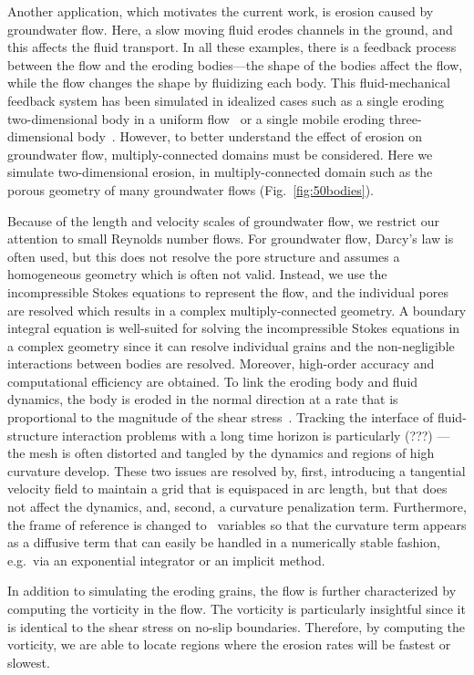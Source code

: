 \documentclass[preprint, 10pt]{elsarticle}
\begin{document}
Another application, which motivates the current work, is erosion caused by groundwater flow.
Here, a slow moving fluid erodes channels in the ground, and this
affects the fluid transport.  In all these examples, there is a feedback
process between the flow and the eroding bodies---the shape of the
bodies affect the flow, while the flow changes the shape by fluidizing
each body.  This fluid-mechanical feedback system has been simulated in
idealized cases such as a single eroding two-dimensional body in a
uniform flow~\cite{moo-ris-chi-zha-she2013} or a single mobile eroding
three-dimensional body~\cite{mit-spa2016}. However, to better understand
the effect of erosion on groundwater flow, multiply-connected domains
must be considered.  Here we simulate two-dimensional erosion, in
multiply-connected domain such as the porous geometry of many
groundwater flows (Fig.~\ref{fig:50bodies}).

Because of the length and velocity scales of groundwater flow, we
restrict our attention to small Reynolds number flows.  For groundwater
flow, Darcy's law is often used, but this does not resolve the pore
structure and assumes a homogeneous geometry which is often not valid.
Instead, we use the incompressible Stokes equations to represent the
flow, and the individual pores are resolved which results in a complex
multiply-connected geometry.  A boundary integral equation is
well-suited for solving the incompressible Stokes equations in a complex
geometry since it can resolve individual grains and the non-negligible
interactions between bodies are resolved. Moreover, high-order accuracy
and computational efficiency are obtained. To link the eroding body and
fluid dynamics, the body is eroded in the normal direction at a rate
that is proportional to the magnitude of the shear
stress~\cite{ris-moo-chi-she-zha2012}.  Tracking the interface of
fluid-structure interaction problems with a long time horizon is
particularly (???) ---the mesh is often distorted and tangled by the dynamics
and regions of high curvature develop.  These two issues are resolved
by, first, introducing a tangential velocity field to maintain a grid
that is equispaced in arc length, but that does not affect the dynamics,
and, second, a curvature penalization term.  Furthermore, the frame of
reference is changed to \thL~variables so that the curvature term
appears as a diffusive term that can easily be handled in a 
numerically stable fashion, e.g.~via an exponential integrator or an implicit method.

In addition to simulating the eroding grains, the flow is further
characterized by computing the vorticity in the flow.  The vorticity is
particularly insightful since it is identical to the shear stress on
no-slip boundaries.  Therefore, by computing the
vorticity, we are able to locate regions where the erosion rates will be
fastest or slowest.
\end{document}
